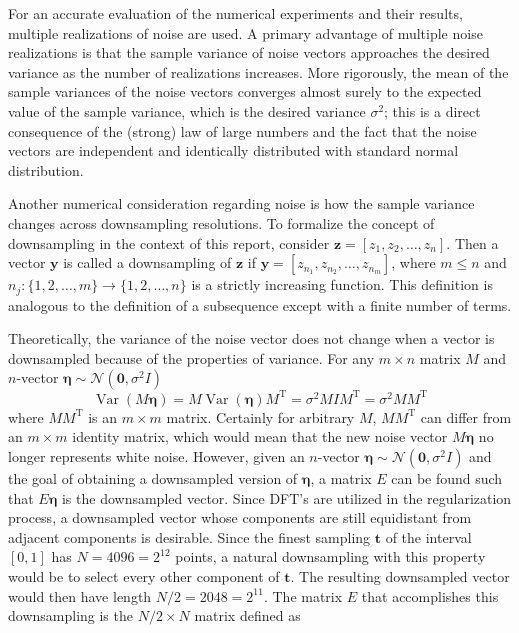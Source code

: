 \documentclass[12pt]{article}
\newcommand{\tdis}{\mathbf{t}}
\newcommand{\trans}{\mathrm{T}}	%
\newcommand{\noiseSD}{\sigma}	%
\newcommand{\noise}{\bm{\eta}}	%
\newcommand{\Var}{\operatorname{Var}}	%
\begin{document}
For an accurate evaluation of the numerical experiments and their results, multiple realizations of noise are used. A primary advantage of multiple noise realizations is that the sample variance of noise vectors approaches the desired variance as the number of realizations increases. More rigorously, the mean of the sample variances of the noise vectors converges almost surely to the expected value of the sample variance, which is the desired variance $\noiseSD^2$; this is a direct consequence of the (strong) law of large numbers and the fact that the noise vectors are independent and identically distributed with standard normal distribution.  \par
Another numerical consideration regarding noise is how the sample variance changes across downsampling resolutions. To formalize the concept of downsampling in the context of this report, consider $\mathbf{z} = [z_1,z_2,\ldots,z_n]$. Then a vector $\mathbf{y}$ is called a downsampling of $\mathbf{z}$ if $\mathbf{y} = [z_{n_1},z_{n_2},\ldots,z_{n_m}]$, where $m \leq n$ and $n_j:\{1,2,\ldots,m\}\rightarrow\{1,2,\ldots,n\}$ is a strictly increasing function. This definition is analogous to the definition of a subsequence except with a finite number of terms. \par
Theoretically, the variance of the noise vector does not change when a vector is downsampled because of the properties of variance. For any $m\times n$ matrix $M$ and $n$-vector $\noise \sim \mathcal{N}(\bm{0},\noiseSD^2I)$
\begin{equation}
\Var(M\noise) = M\Var(\noise)M^{\trans} = \noiseSD^2MIM^{\trans} = \noiseSD^2MM^{\trans}
\label{eq:VarProp}
\end{equation}
where $MM^\trans$ is an $m \times m$ matrix. Certainly for arbitrary $M$, $MM^\trans$ can differ from an $m \times m$ identity matrix, which would mean that the new noise vector $M\noise$ no longer represents white noise. However, given an $n$-vector $\noise \sim \mathcal{N}(\bm{0},\noiseSD^2I)$ and the goal of obtaining a downsampled version of $\noise$, a matrix $E$ can be found such that $E\noise$ is the downsampled vector. Since DFT's are utilized in the regularization process, a downsampled vector whose components are still equidistant from adjacent components is desirable. Since the finest sampling $\tdis$ of the interval $[0,1]$ has $N = 4096 = 2^{12}$ points, a natural downsampling with this property would be to select every other component of $\tdis$. The resulting downsampled vector would then have length $N/2 = 2048 = 2^{11}$. The matrix $E$ that accomplishes this downsampling is the $N/2 \times N$ matrix defined as
\end{document}
